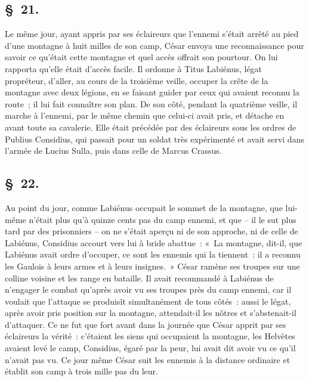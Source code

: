 \documentclass[french,twoside]{book} %
\begin{document}
\subsection[{§ 21.}]{ \textsc{§ 21.} }
\noindent Le même jour, ayant appris par ses éclaireurs que l’ennemi s’était arrêté au pied d’une montagne à huit milles de son camp, César envoya une reconnaissance pour savoir ce qu’était cette montagne et quel accès offrait son pourtour. On lui rapporta qu’elle était d’accès facile. Il ordonne à Titus Labiénus, légat propréteur, d’aller, au cours de la troisième veille, occuper la crête de la montagne avec deux légions, en se faisant guider par ceux qui avaient reconnu la route ; il lui fait connaître son plan. De son côté, pendant la quatrième veille, il marche à l’ennemi, par le même chemin que celui-ci avait pris, et détache en avant toute sa cavalerie. Elle était précédée par des éclaireurs sous les ordres de Publius Considius, qui passait pour un soldat très expérimenté et avait servi dans l’armée de Lucius Sulla, puis dans celle de Marcus Crassus.
\subsection[{§ 22.}]{ \textsc{§ 22.} }
\noindent Au point du jour, comme Labiénus occupait le sommet de la montagne, que lui-même n’était plus qu’à quinze cents pas du camp ennemi, et que – il le sut plus tard par des prisonniers – on ne s’était aperçu ni de son approche, ni de celle de Labiénus, Considius accourt vers lui à bride abattue : « La montagne, dit-il, que Labiénus avait ordre d’occuper, ce sont les ennemis qui la tiennent : il a reconnu les Gaulois à leurs armes et à leurs insignes. » César ramène ses troupes sur une colline voisine et les range en bataille. Il avait recommandé à Labiénus de n’engager le combat qu’après avoir vu ses troupes près du camp ennemi, car il voulait que l’attaque se produisît simultanément de tous côtés : aussi le légat, après avoir pris position sur la montagne, attendait-il les nôtres et s’abstenait-il d’attaquer. Ce ne fut que fort avant dans la journée que César apprit par ses éclaireurs la vérité : c’étaient les siens qui occupaient la montagne, les Helvètes avaient levé le camp, Considius, égaré par la peur, lui avait dit avoir vu ce qu’il n’avait pas vu. Ce jour même César suit les ennemis à la distance ordinaire et établit son camp à trois mille pas du leur.
\end{document}
